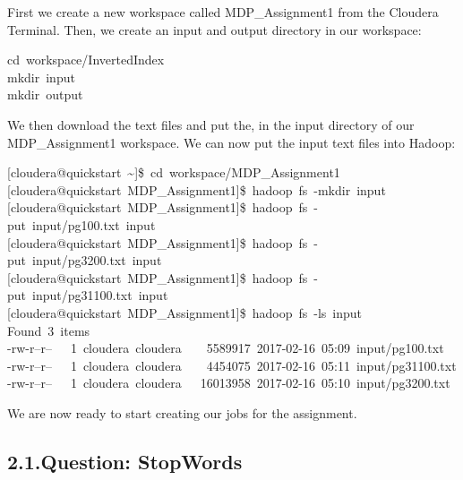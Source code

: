 \documentclass{article}
\begin{document}
\noindent First we create a new workspace called MDP\_Assignment1 from the Cloudera Terminal. Then, we create an input and output directory in our workspace:%
\begin{mdpre}%
\noindent cd~workspace/InvertedIndex\\
mkdir~input\\
mkdir~output\\
\end{mdpre}\noindent We then download the text files and put the, in the input directory of our MDP\_Assignment1 workspace.
We can now put the input text files into Hadoop:
\begin{mdpre}%
\noindent{}[cloudera@quickstart~\textasciitilde{}]\$~cd~workspace/MDP\_Assignment1\\
{}[cloudera@quickstart~MDP\_Assignment1]\$~hadoop~fs~-mkdir~input\\
{}[cloudera@quickstart~MDP\_Assignment1]\$~hadoop~fs~-put~input/pg100.txt~input\\
{}[cloudera@quickstart~MDP\_Assignment1]\$~hadoop~fs~-put~input/pg3200.txt~input\\
{}[cloudera@quickstart~MDP\_Assignment1]\$~hadoop~fs~-put~input/pg31100.txt~input\\
{}[cloudera@quickstart~MDP\_Assignment1]\$~hadoop~fs~-ls~input\\
Found~{3}~items\\
-rw-r--r--~~~{1}~cloudera~cloudera~~~~{5589917}~{2017}-{02}-{16}~{05}:{09}~input/pg100.txt\\
-rw-r--r--~~~{1}~cloudera~cloudera~~~~{4454075}~{2017}-{02}-{16}~{05}:{11}~input/pg31100.txt\\
-rw-r--r--~~~{1}~cloudera~cloudera~~~{16013958}~{2017}-{02}-{16}~{05}:{10}~input/pg3200.txt\\
\end{mdpre}\noindent We are now ready to start creating our jobs for the assignment.

\subsection{2.1.\hspace*{0.5em}Question: StopWords}\label{heading}%
\end{document}
